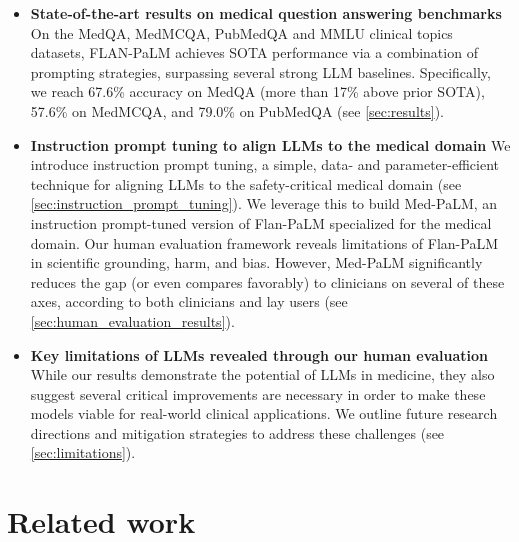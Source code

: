 \documentclass[10pt, letter, onecolumn]{arxiv}
\begin{document}
\begin{refsection}
\begin{itemize}[leftmargin=1.5em,rightmargin=0em]
\begin{itemize}
\end{itemize}

\item \textbf{State-of-the-art results on medical question answering benchmarks} On the MedQA, MedMCQA, PubMedQA and MMLU clinical topics datasets, FLAN-PaLM achieves SOTA performance via a combination of prompting strategies, surpassing several strong LLM baselines. Specifically, we reach 67.6\% accuracy on MedQA (more than 17\% above prior SOTA), 57.6\% on MedMCQA, and 79.0\% on PubMedQA (see \cref{sec:results}).

\item \textbf{Instruction prompt tuning to align LLMs to the medical domain} We introduce instruction prompt tuning, a simple, data- and parameter-efficient technique for aligning LLMs to the safety-critical medical domain (see \cref{sec:instruction_prompt_tuning}). We leverage this to build Med-PaLM, an instruction prompt-tuned version of Flan-PaLM specialized for the medical domain. Our human evaluation framework reveals limitations of Flan-PaLM in scientific grounding, harm, and bias. However, Med-PaLM significantly reduces the gap (or even compares favorably) to clinicians on several of these axes, according to both clinicians and lay users (see \cref{sec:human_evaluation_results}).

\item \textbf{Key limitations of LLMs revealed through our human evaluation} While our results demonstrate the potential of LLMs in medicine, they also suggest several critical improvements are necessary in order to make these models viable for real-world clinical applications. We outline future research directions and mitigation strategies to address these challenges (see \cref{sec:limitations}).

\end{itemize}

\section{Related work}
\label{sec:related_work}

\end{refsection}
\end{document}
